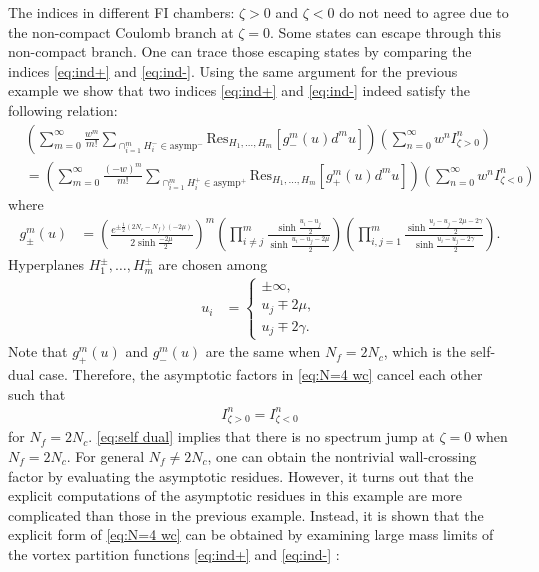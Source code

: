 \documentclass[a4paper,11pt]{article}
\begin{document}
The indices in different FI chambers: $\zeta > 0$ and $\zeta < 0$ do not need to agree due to the non-compact Coulomb branch at $\zeta = 0$. Some states can escape through this non-compact branch. One can trace those escaping states by comparing the indices \eqref{eq:ind+} and \eqref{eq:ind-}. Using the same argument for the previous example we show that two indices \eqref{eq:ind+} and \eqref{eq:ind-} indeed satisfy the following relation:
\begin{align}
\label{eq:N=4 wc}
%
& \left(\sum_{m = 0}^\infty \frac{w^m}{m!} \sum_{\cap_{i = 1}^m H_i^- \in \text{asymp}^-} \mathrm{Res}_{H_1,\ldots,H_m} \left[g^m_- (u) d^m u\right]\right) \left(\sum_{n = 0}^\infty w^n I^n_{\zeta > 0}\right) \nonumber \\
%
&= \left(\sum_{m = 0}^\infty \frac{(-w)^m}{m!} \sum_{\cap_{i = 1}^m H_i^+ \in \text{asymp}^+} \mathrm{Res}_{H_1,\ldots,H_m} \left[g^m_+ (u) d^m u\right]\right) \left(\sum_{n = 0}^\infty w^n I^n_{\zeta < 0}\right)
%
\end{align}
where
\begin{align}
g^m_\pm (u) &= \left(\frac{e^{\pm \frac{1}{2} (2 N_c-N_f) (-2 \mu)}}{2 \sinh \frac{-2 \mu}{2}}\right)^m \left(\prod_{i \neq j}^m \frac{\sinh \frac{u_i-u_j}{2}}{\sinh \frac{u_i-u_j-2 \mu}{2}}\right) \left(\prod_{i,j = 1}^m \frac{\sinh \frac{u_i-u_j-2 \mu-2 \gamma}{2}}{\sinh \frac{u_i-u_j-2 \gamma}{2}}\right).
\end{align}
Hyperplanes $H_1^\pm,\ldots,H_m^\pm$ are chosen among
\begin{align}
u_i &= \left\{\begin{array}{l}
\pm \infty, \\
u_j \mp 2 \mu, \\
u_j \mp 2 \gamma.
\end{array}\right.
\end{align}
Note that $g^m_+ (u)$ and $g^m_- (u)$ are the same when $N_f = 2 N_c$, which is the self-dual case. Therefore, the asymptotic factors in \eqref{eq:N=4 wc} cancel each other such that
\begin{align}
\label{eq:self dual}
I^n_{\zeta > 0} = I^n_{\zeta < 0}
\end{align}
for $N_f = 2 N_c$. \eqref{eq:self dual} implies that there is no spectrum jump at $\zeta = 0$ when $N_f = 2 N_c$. For general $N_f \neq 2 N_c$, one can obtain the nontrivial wall-crossing factor by evaluating the asymptotic residues. However, it turns out that the explicit computations of the asymptotic residues in this example are more complicated than those in the previous example. Instead, it is shown that the explicit form of \eqref{eq:N=4 wc} can be obtained by examining large mass limits of the vortex partition functions \eqref{eq:ind+} and \eqref{eq:ind-} \cite{Hwang:2015wna}:
\end{document}
